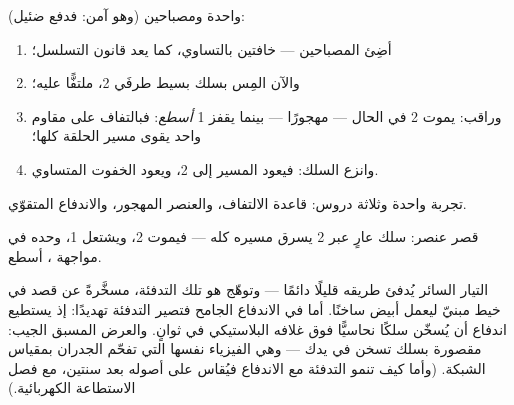 \begin{method}\label{met:g7:short-circuits-safety:demo}
 واحدة ومصباحين  (وهو آمن: فدفع 
ضئيل):
\begin{enumerate}
  \item أضِئ المصباحين --- خافتين بالتساوي، كما يعد قانون
        التسلسل؛
  \item والآن المِس بسلك بسيط طرفَي  2، ملتفًّا عليه؛
  \item وراقب: يموت  2 في الحال --- مهجورًا --- بينما
        يقفز  1 \emph{أسطع}: فبالتفاف على مقاوم واحد
        يقوى مسير الحلقة كلها؛
  \item وانزع السلك: فيعود المسير إلى  2، ويعود الخفوت
        المتساوي.
\end{enumerate}
تجربة واحدة وثلاثة دروس: قاعدة الالتفاف، والعنصر المهجور،
والاندفاع المتقوّي.
\end{method}

\begin{omfigure}

{\small قصر عنصر: سلك عارٍ عبر  2 يسرق مسيره كله ---
فيموت  2، ويشتعل  1، وحده في مواجهة ،
أسطع.}
\end{omfigure}

\begin{example}\label{ex:g7:short-circuits-safety:heating}
التيار السائر يُدفئ طريقه قليلًا دائمًا --- وتوهّج  هو
تلك التدفئة، مسخَّرةً عن قصد في خيط مبنيّ ليعمل أبيض ساخنًا. أما
في الاندفاع الجامح فتصير التدفئة تهديدًا: إذ يستطيع اندفاع
 أن يُسخّن سلكًا نحاسيًّا فوق  غلافه
البلاستيكي في ثوانٍ. والعرض المسبق  الجيب:  مقصورة
بسلك تسخن في يدك --- وهي الفيزياء نفسها التي تفحّم الجدران
بمقياس الشبكة. (وأما كيف تنمو التدفئة مع الاندفاع فيُقاس على
أصوله بعد سنتين، مع فصل الاستطاعة الكهربائية.)
\end{example}

